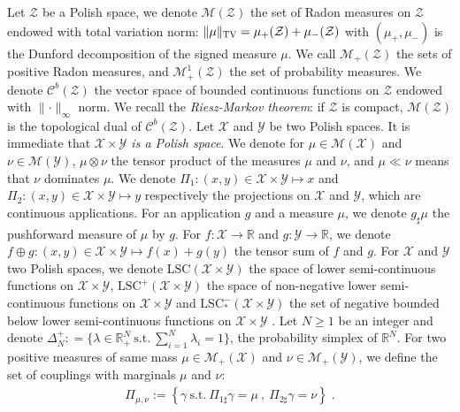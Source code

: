 Let $\mathcal{Z}$ be a Polish space, we denote $\mathcal{M}(\mathcal{Z})$ the set of Radon measures on $\mathcal{Z}$ endowed with total variation norm: $\lVert\mu\rVert_{\textsc{TV}}=\mu_+(\mathcal{Z})+\mu_-(\mathcal{Z})$ with $(\mu_+,\mu_-)$ is the Dunford decomposition of the signed measure $\mu$. We call $\mathcal{M}_+(\mathcal{Z})$ the sets of positive Radon measures, and  $\mathcal{M}^1_+(\mathcal{Z})$ the set of probability measures. We denote $\mathcal{C}^b(\mathcal{Z})$ the vector space of bounded continuous functions on $\mathcal{Z}$ endowed with $\lVert\cdot \rVert_\infty$ norm. We recall the \textit{Riesz-Markov theorem}: if $\mathcal{Z}$ is compact, $\mathcal{M}(\mathcal{Z})$ is the topological dual of $\mathcal{C}^b(\mathcal{Z})$. Let $\mathcal{X}$ and $\mathcal{Y}$ be two Polish spaces. It is immediate  that \textit{$\mathcal{X}\times\mathcal{Y}$ is a Polish space}.  We denote for $\mu\in\mathcal{M}(\mathcal{X})$ and $\nu\in\mathcal{M}(\mathcal{Y})$, $\mu\otimes\nu$ the tensor product of the measures $\mu$ and $\nu$, and $\mu\ll\nu$ means that $\nu$ dominates $\mu$.  We denote $\Pi_1:(x,y)\in\mathcal{X}\times\mathcal{Y}\mapsto x$ and $\Pi_2:(x,y)\in\mathcal{X}\times\mathcal{Y}\mapsto y$ respectively the projections on $\mathcal{X}$ and  $\mathcal{Y}$, which are continuous applications. For an application $g$ and a measure $\mu$, we denote $g_\sharp\mu$ the pushforward measure of $\mu$ by $g$. For $f:\mathcal{X}\rightarrow\mathbb{R}$ and $g:\mathcal{Y}\rightarrow\mathbb{R}$, we denote $f\oplus g:(x,y)\in\mathcal{X}\times\mathcal{Y}\mapsto f(x)+g(y)$ the tensor sum of $f$ and $g$. For  $\mathcal{X}$ and $\mathcal{Y}$ two Polish spaces, we denote $\text{LSC}(\mathcal{X}\times\mathcal{Y})$ the space of lower semi-continuous functions on $\mathcal{X}\times\mathcal{Y}$,  $\mathrm{LSC}^+(\mathcal{X}\times\mathcal{Y})$ the space of non-negative lower semi-continuous functions on $\mathcal{X}\times\mathcal{Y}$ and $\mathrm{LSC}^-_{*}(\mathcal{X}\times\mathcal{Y})$ the set of negative bounded below lower semi-continuous functions on $\mathcal{X}\times\mathcal{Y}$ .  Let $N\geq 1$ be an integer and denote $\Delta_N^{+}: = \{\lambda\in\mathbb{R}_+^N~\mathrm{s.t.}~\sum_{i=1}^N\lambda_i=1\}$, the probability simplex of $\mathbb{R}^N$.
For two positive measures of same mass $\mu\in\mathcal{M}_+(\mathcal{X})$ and $\nu\in\mathcal{M}_+(\mathcal{Y})$, we define the set of couplings with marginals $\mu$ and $\nu$:
\begin{align*}
    \Pi_{\mu,\nu}:=\left\{\gamma~\mathrm{s.t.}~ \Pi_{1\sharp}\gamma=\mu ~,~ \Pi_{2\sharp}\gamma=\nu\right\}\; .
\end{align*}
